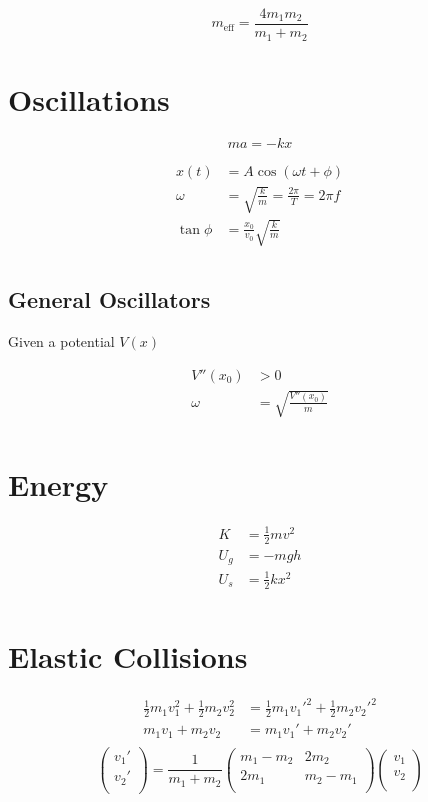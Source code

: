 \documentclass[12pt]{article}
\begin{document}
$$
m_{\text{eff}} = \frac{4m_1 m_2}{m_1 + m_2}
$$

\section{Oscillations}
$$
ma = -kx
$$

\begin{align*}
    x(t) &= A \cos{(\omega t + \phi)} \\
    \omega &= \sqrt{\frac{k}{m}} = \frac{2 \pi}{T} = 2\pi f\\
    \tan{\phi} &= \frac{x_0}{v_0} \sqrt{\frac{k}{m}} \\
\end{align*}

\subsection{General Oscillators}
Given a potential $V(x)$

\begin{align*}
    V''(x_0) &> 0 \\
    \omega &= \sqrt{\frac{V''(x_0)}{m}} \\
\end{align*}

\section{Energy}
\begin{align*}
    K &= \frac{1}{2} mv^2 \\
    U_g &= -mgh \\
    U_s &= \frac{1}{2} kx^2 \\
\end{align*}

\section{Elastic Collisions}

\begin{align*}
    \frac{1}{2} m_1 v_1^2 + \frac{1}{2} m_2 v_2^2 &= \frac{1}{2} m_1 v_1 '^2 + \frac{1}{2} m_2 v_2'^2 \\
    m_1 v_1 + m_2 v_2 &= m_1 v_1 ' + m_2 v_2 ' \\
\end{align*}
\[\begin{pmatrix}
v_1 ' \\
v_2 ' \\
\end{pmatrix}
= \frac{1}{m_1 + m_2}
\begin{pmatrix}
m_1 - m_2 & 2m_2 \\
2m_1 & m_2 - m_1 \\
\end{pmatrix}
\begin{pmatrix}
v_1 \\
v_2 \\
\end{pmatrix}
\]
\end{document}
